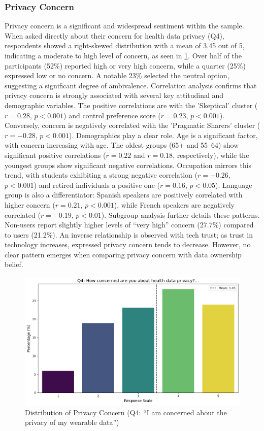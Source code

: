 	\subsubsection{Privacy Concern}
		Privacy concern is a significant and widespread sentiment within the sample. When asked directly about their concern for health data privacy (Q4), respondents showed a right-skewed distribution with a mean of 3.45 out of 5, indicating a moderate to high level of concern, as seen in \ref{fig:privacy_concern_q4}. Over half of the participants (52\%) reported high or very high concern, while a quarter (25\%) expressed low or no concern. A notable 23\% selected the neutral option, suggesting a significant degree of ambivalence.
		Correlation analysis confirms that privacy concern is strongly associated with several key attitudinal and demographic variables. The positive correlations are with the 'Skeptical' cluster ($r = 0.28$, $p < 0.001$) and control preference score ($r = 0.23$, $p < 0.001$). Conversely, concern is negatively correlated with the 'Pragmatic Sharers' cluster ($r = -0.28$, $p < 0.001$).
		Demographics play a clear role. Age is a significant factor, with concern increasing with age. The oldest groups (65+ and 55--64) show significant positive correlations ($r = 0.22$ and $r = 0.18$, respectively), while the youngest groups show significant negative correlations. Occupation mirrors this trend, with students exhibiting a strong negative correlation ($r = -0.26$, $p < 0.001$) and retired individuals a positive one ($r = 0.16$, $p < 0.05$). Language group is also a differentiator: Spanish speakers are positively correlated with higher concern ($r = 0.21$, $p < 0.001$), while French speakers are negatively correlated ($r = -0.19$, $p < 0.01$).
		Subgroup analysis further details these patterns. Non-users report slightly higher levels of ``very high'' concern (27.7\%) compared to users (21.2\%). An inverse relationship is observed with tech trust; as trust in technology increases, expressed privacy concern tends to decrease. However, no clear pattern emerges when comparing privacy concern with data ownership belief.
		\begin{figure}[h!]\centering
			\includegraphics[width=0.7\linewidth]{figures/questions/Q4_likert.png}
			\caption{Distribution of Privacy Concern (Q4: ``I am concerned about the privacy of my wearable data'')}
			\label{fig:privacy_concern_q4}
		\end{figure}
